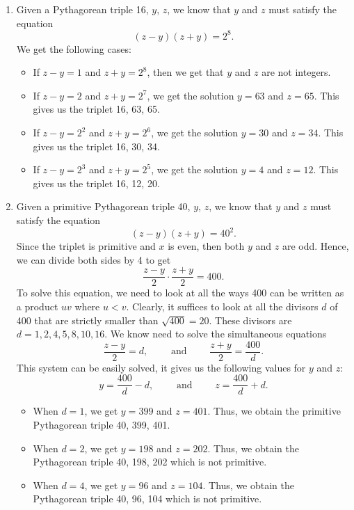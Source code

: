 \begin{solution}
    \begin{enumerate}
        \item Given a Pythagorean triple 16, $y$, $z$, we know that $y$ and $z$ must satisfy the equation
        $$(z-y)(z+y) = 2^8.$$
        We get the following cases:
        \begin{itemize}
            \item If $z-y = 1$ and $z + y = 2^8$, then we get that $y$ and $z$ are not integers.
            \item If $z-y = 2$ and $z + y = 2^7$, we get the solution $y = 63$ and $z = 65$. This gives us the triplet 16, 63, 65.
            \item If $z-y = 2^2$ and $z + y = 2^6$, we get the solution $y = 30$ and $z = 34$. This gives us the triplet 16, 30, 34.
            \item If $z-y = 2^3$ and $z + y = 2^5$, we get the solution $y = 4$ and $z = 12$. This gives us the triplet 16, 12, 20.
        \end{itemize}
        \item Given a primitive Pythagorean triple 40, $y$, $z$, we know that $y$ and $z$ must satisfy the equation
        $$(z-y)(z+y) = 40^2.$$
        Since the triplet is primitive and $x$ is even, then both $y$ and $z$ are odd. Hence, we can divide both sides by 4 to get
        $$\frac{z-y}{2}\cdot\frac{z+y}{2} = 400.$$
        To solve this equation, we need to look at all the ways 400 can be written as a product $uv$ where $u < v$. Clearly, it suffices to look at all the divisors $d$ of 400 that are strictly smaller than $\sqrt{400} = 20$. These divisors are $d = 1, 2, 4, 5, 8, 10, 16$. We know need to solve the simultaneous equations
        $$\frac{z-y}{2} = d, \qquad \text{ and } \qquad \frac{z+y}{2} = \frac{400}{d}.$$
        This system can be easily solved, it gives us the following values for $y$ and $z$:
        $$y = \frac{400}{d} - d, \qquad \text{ and } \qquad z = \frac{400}{d} + d.$$
        \begin{itemize}
            \item When $d = 1$, we get $y = 399$ and $z = 401$. Thus, we obtain the primitive Pythagorean triple 40, 399, 401.
            \item When $d = 2$, we get $y = 198$ and $z = 202$. Thus, we obtain the Pythagorean triple 40, 198, 202 which is not primitive.
            \item When $d = 4$, we get $y = 96$ and $z = 104$. Thus, we obtain the Pythagorean triple 40, 96, 104 which is not primitive.

\end{itemize}
\end{enumerate}
\end{solution}
